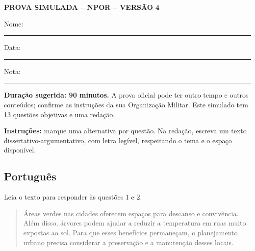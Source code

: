 \documentclass[12pt,a4paper]{article}
\begin{document}
\begin{center}
  {\Large\bfseries PROVA SIMULADA -- NPOR -- VERSÃO 4}\par
  \vspace{0.4cm}
  Nome: \rule{9cm}{0.4pt}\par\vspace{0.3cm}
  Data: \rule{4cm}{0.4pt}\hfill Nota: \rule{3cm}{0.4pt}
\end{center}

\noindent\textbf{Duração sugerida: 90 minutos.} A prova oficial pode ter outro tempo e outros conteúdos; confirme as instruções da sua Organização Militar. Este simulado tem 13 questões objetivas e uma redação.

\medskip
\noindent\textbf{Instruções:} marque uma alternativa por questão. Na redação, escreva um texto dissertativo-argumentativo, com letra legível, respeitando o tema e o espaço disponível.

\subsection*{Português}
Leia o texto para responder às questões 1 e 2.

\begin{quote}
Áreas verdes nas cidades oferecem espaços para descanso e convivência. Além disso, árvores podem ajudar a reduzir a temperatura em ruas muito expostas ao sol. Para que esses benefícios permaneçam, o planejamento urbano precisa considerar a preservação e a manutenção desses locais.
\end{quote}
\end{document}
